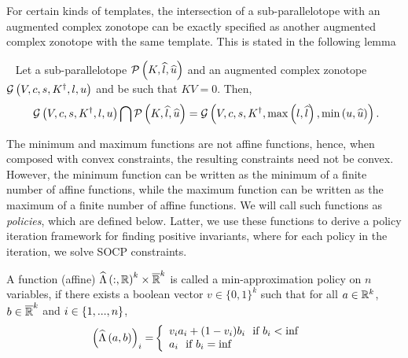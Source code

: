 For certain kinds of templates, the intersection of a
sub-parallelotope with an augmented complex zonotope can be exactly
specified as another augmented complex zonotope with the same
template.  This is stated in the following lemma 
\begin{lemma}~\label{lem:intersection} Let a sub-parallelotope
  $\mathcal{P}\left(K,\widehat{l},\widehat{u}\right)$ and an augmented complex zonotope
  $\mathcal{G}\left(V,c,s,K^\dagger,l,u\right)$ and be such that $KV=0$.  Then,
\begin{equation}~\label{eqn:intersection}
\mathcal{G}\left(V,c,s,K^\dagger,l,u\right)\bigcap \mathcal{P}\left(K,\widehat{l},\widehat{u}\right) =
  \mathcal{G}\left(V,c,s,K^\dagger,\max\left(l,\widehat{l}\right),\min\left(u,\widehat{u}\right)\right).
\end{equation}
\end{lemma}

The minimum and maximum functions are not affine functions, hence,
when composed with convex constraints, the resulting constraints need
not be convex.  However, the minimum function can be written as the
minimum of a finite number of affine functions, while the
maximum function can be written as the maximum of a finite number of
affine functions.  We will call such functions as \emph{policies}, which are
defined below.  Latter, we use these functions to derive a policy
iteration framework for finding positive invariants, where for each
policy in the iteration, we solve SOCP constraints.

\begin{definition} A function (affine)
  $\widehat{\Lambda}\left(:,\mathbb{R}\right)^k\times\mathbb{\overline{R}}^k$ is called a
  min-approximation policy on $n$ variables, if there exists a boolean
  vector $v\in\{0,1\}^k$ such that for all $a\in\mathbb{R}^k$,
  $b\in\mathbb{\overline{R}}^k$ and $i\in\{1,...,n\}$,
\begin{align}
\left(\widehat{\Lambda}\left(a,b\right)\right)_i= & \left\{
\begin{array}{l}
v_ia_i+(1-v_i)b_i~~\text{if}~b_i<\inf\\
a_i~~\text{if}~b_i=\inf
\end{array}
\right.
\end{align}
\end{definition}
%


